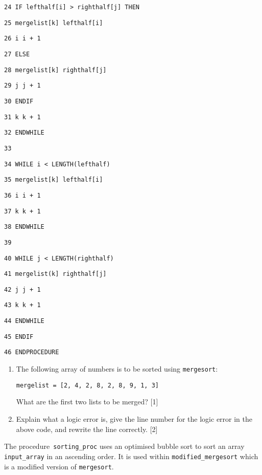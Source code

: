 \begin{minipage}[t]{1\columnwidth}
\texttt{24 \qquad{}\qquad{}\qquad{}IF lefthalf{[}i{]} > righthalf{[}j{]}
THEN }

\texttt{25 \qquad{}\qquad{}\qquad{}\qquad{}mergelist{[}k{]} \textleftarrow{}
lefthalf{[}i{]}}

\texttt{26 \qquad{}\qquad{}\qquad{}\qquad{}i \textleftarrow{}
i + 1 }

\texttt{27 \qquad{}\qquad{}\qquad{}ELSE }

\texttt{28 \qquad{}\qquad{}\qquad{}\qquad{}mergelist{[}k{]} \textleftarrow{}
righthalf{[}j{]} }

\texttt{29 \qquad{}\qquad{}\qquad{}\qquad{}j \textleftarrow{}
j + 1 }

\texttt{30 \qquad{}\qquad{}\qquad{}ENDIF }

\texttt{31 \qquad{}\qquad{}\qquad{}k \textleftarrow{} k + 1}

\texttt{32 \qquad{}\qquad{}ENDWHILE }

\texttt{33}

\texttt{34 \qquad{}\qquad{}WHILE i < LENGTH(lefthalf) }

\texttt{35 \qquad{}\qquad{}\qquad{}mergelist{[}k{]} \textleftarrow{}
lefthalf{[}i{]} }

\texttt{36 \qquad{}\qquad{}\qquad{}i \textleftarrow{} i + 1 }

\texttt{37 \qquad{}\qquad{}\qquad{}k \textleftarrow{} k + 1 }

\texttt{38 \qquad{}\qquad{}ENDWHILE }

\texttt{39}

\texttt{40 \qquad{}\qquad{}WHILE j < LENGTH(righthalf) }

\texttt{41 \qquad{}\qquad{}\qquad{}mergelist(k{]} \textleftarrow{}
righthalf{[}j{]} }

\texttt{42 \qquad{}\qquad{}\qquad{}j \textleftarrow{} j + 1 }

\texttt{43 \qquad{}\qquad{}\qquad{}k \textleftarrow{} k + 1 }

\texttt{44 \qquad{}\qquad{}ENDWHILE }

\texttt{45 \qquad{}ENDIF }

\texttt{46 ENDPROCEDURE }%
\end{minipage}
\begin{enumerate}
\item The following array of numbers is to be sorted using \texttt{mergesort}: 
\noindent \begin{center}
\texttt{mergelist = {[}2, 4, 2, 8, 2, 8, 9, 1, 3{]}} 
\par\end{center}

What are the first two lists to be merged? \hfill{}{[}1{]}
\item Explain what a logic error is, give the line number for the logic
error in the above code, and rewrite the line correctly. \hfill{}
{[}2{]}
\end{enumerate}
The procedure\texttt{ sorting\_proc} uses an optimised bubble sort
to sort an array\texttt{ input\_array} in an ascending order. It is
used within \texttt{modified\_mergesort} which is a modified version
of \texttt{mergesort}. 

